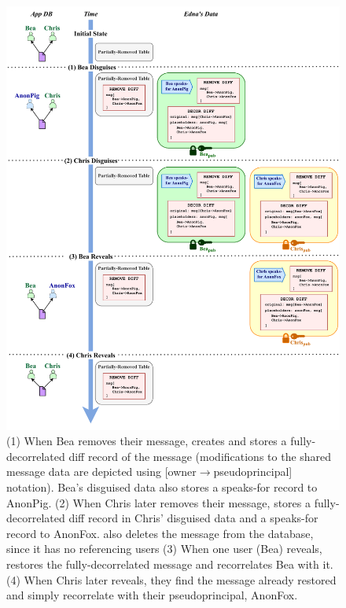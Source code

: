 \begin{figure}
    \centering
    \includegraphics[width=\textwidth]{figs/shared_data}
    \caption[\sys implements disguising of shared data using
    pseudoprincipals and diff records.]{(1) When Bea removes their message, \sys
    creates and stores a fully-decorrelated diff record of the message
    (modifications to the shared message data are depicted using
    [owner$\to$pseudoprincipal] notation). Bea's disguised data also stores a
    speaks-for record to AnonPig.
    (2) When Chris later removes their message, \sys stores a fully-decorrelated
    diff record in Chris' disguised data and a speaks-for record to AnonFox.
    \sys also deletes the message from the database, since it has no referencing
    users
    (3) When one user (\eg Bea) reveals, \sys restores the
    fully-decorrelated message and recorrelates Bea with it.
    (4) When Chris later reveals, they find the message already restored and
    simply recorrelate with their pseudoprincipal, AnonFox.
    }
\label{f:shared:data}
\end{figure}

